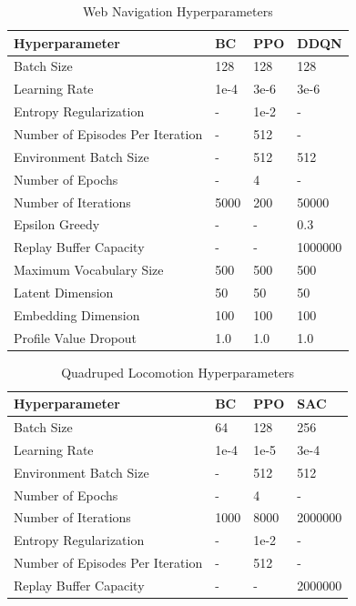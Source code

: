 \begin{table}[H]
\centering
\begin{tabular}{|l|l|l|l|}
\hline
\textbf{Hyperparameter} & \textbf{BC} & \textbf{PPO} & \textbf{DDQN} \\ \hline
Batch Size & 128 & 128 & 128 \\ \hline
Learning Rate & 1e-4 & 3e-6 & 3e-6 \\ \hline
Entropy Regularization & - & 1e-2 & - \\ \hline
Number of Episodes Per Iteration & - & 512 & - \\ \hline
Environment Batch Size & - & 512 & 512 \\ \hline
Number of Epochs & - & 4 & - \\ \hline
Number of Iterations & 5000 & 200 & 50000 \\ \hline
Epsilon Greedy & - & - & 0.3 \\ \hline
Replay Buffer Capacity & - & - & 1000000 \\ \hline
Maximum Vocabulary Size & 500 & 500 & 500 \\ \hline
Latent Dimension & 50 & 50 & 50 \\ \hline
Embedding Dimension & 100 & 100 & 100 \\ \hline
Profile Value Dropout & 1.0 & 1.0 & 1.0 \\ \hline
\end{tabular}
\vspace{0.5em}
\caption{Web Navigation Hyperparameters}
\end{table}

\begin{table}[H]
\centering
\begin{tabular}{|l|l|l|l|}
\hline
\textbf{Hyperparameter} & \textbf{BC} & \textbf{PPO} & \textbf{SAC} \\ \hline
Batch Size & 64 & 128 & 256 \\ \hline
Learning Rate & 1e-4 & 1e-5 & 3e-4 \\ \hline
Environment Batch Size & - & 512 & 512 \\ \hline
Number of Epochs & - & 4 & - \\ \hline
Number of Iterations & 1000 & 8000 & 2000000 \\ \hline
Entropy Regularization & - & 1e-2 & - \\ \hline
Number of Episodes Per Iteration & - & 512 & - \\ \hline
Replay Buffer Capacity & - & - & 2000000 \\ \hline
\end{tabular}
\vspace{0.5em}
\caption{Quadruped Locomotion Hyperparameters}

\end{table}
